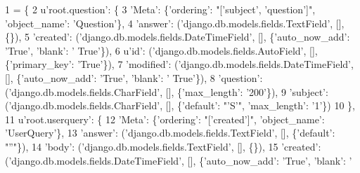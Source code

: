 \begin{DoxyCode}
1 = \{
2         \textcolor{stringliteral}{u'root.question'}: \{
3             \textcolor{stringliteral}{'Meta'}: \{\textcolor{stringliteral}{'ordering'}: \textcolor{stringliteral}{"['subject', 'question']"}, \textcolor{stringliteral}{'object\_name'}: \textcolor{stringliteral}{'Question'}\},
4             \textcolor{stringliteral}{'answer'}: (\textcolor{stringliteral}{'django.db.models.fields.TextField'}, [], \{\}),
5             \textcolor{stringliteral}{'created'}: (\textcolor{stringliteral}{'django.db.models.fields.DateTimeField'}, [], \{\textcolor{stringliteral}{'auto\_now\_add'}: \textcolor{stringliteral}{'True'}, \textcolor{stringliteral}{'blank'}: \textcolor{stringliteral}{'
      True'}\}),
6             \textcolor{stringliteral}{u'id'}: (\textcolor{stringliteral}{'django.db.models.fields.AutoField'}, [], \{\textcolor{stringliteral}{'primary\_key'}: \textcolor{stringliteral}{'True'}\}),
7             \textcolor{stringliteral}{'modified'}: (\textcolor{stringliteral}{'django.db.models.fields.DateTimeField'}, [], \{\textcolor{stringliteral}{'auto\_now\_add'}: \textcolor{stringliteral}{'True'}, \textcolor{stringliteral}{'blank'}: \textcolor{stringliteral}{'
      True'}\}),
8             \textcolor{stringliteral}{'question'}: (\textcolor{stringliteral}{'django.db.models.fields.CharField'}, [], \{\textcolor{stringliteral}{'max\_length'}: \textcolor{stringliteral}{'200'}\}),
9             \textcolor{stringliteral}{'subject'}: (\textcolor{stringliteral}{'django.db.models.fields.CharField'}, [], \{\textcolor{stringliteral}{'default'}: \textcolor{stringliteral}{"'S'"}, \textcolor{stringliteral}{'max\_length'}: \textcolor{stringliteral}{'1'}\})
10         \},
11         \textcolor{stringliteral}{u'root.userquery'}: \{
12             \textcolor{stringliteral}{'Meta'}: \{\textcolor{stringliteral}{'ordering'}: \textcolor{stringliteral}{"['created']"}, \textcolor{stringliteral}{'object\_name'}: \textcolor{stringliteral}{'UserQuery'}\},
13             \textcolor{stringliteral}{'answer'}: (\textcolor{stringliteral}{'django.db.models.fields.TextField'}, [], \{\textcolor{stringliteral}{'default'}: \textcolor{stringliteral}{"''"}\}),
14             \textcolor{stringliteral}{'body'}: (\textcolor{stringliteral}{'django.db.models.fields.TextField'}, [], \{\}),
15             \textcolor{stringliteral}{'created'}: (\textcolor{stringliteral}{'django.db.models.fields.DateTimeField'}, [], \{\textcolor{stringliteral}{'auto\_now\_add'}: \textcolor{stringliteral}{'True'}, \textcolor{stringliteral}{'blank'}: \textcolor{stringliteral}{'
}
\end{DoxyCode}
